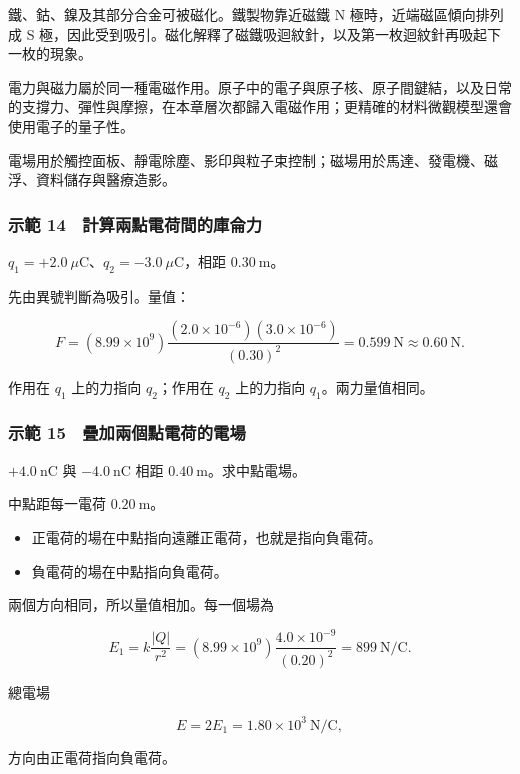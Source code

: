 \documentclass[11pt,a4paper]{article}
\providecommand{\tightlist}{%
  \setlength{\itemsep}{0pt}\setlength{\parskip}{0pt}}
\begin{document}
鐵、鈷、鎳及其部分合金可被磁化。鐵製物靠近磁鐵 N 極時，近端磁區傾向排列成 S 極，因此受到吸引。磁化解釋了磁鐵吸迴紋針，以及第一枚迴紋針再吸起下一枚的現象。

電力與磁力屬於同一種電磁作用。原子中的電子與原子核、原子間鍵結，以及日常的支撐力、彈性與摩擦，在本章層次都歸入電磁作用；更精確的材料微觀模型還會使用電子的量子性。

電場用於觸控面板、靜電除塵、影印與粒子束控制；磁場用於馬達、發電機、磁浮、資料儲存與醫療造影。

\subsubsection{示範 14　計算兩點電荷間的庫侖力}\label{ux793aux7bc4-14-ux8a08ux7b97ux5169ux9edeux96fbux8377ux9593ux7684ux5eabux4f96ux529b}

\(q_1=+2.0\ \mu\mathrm C\)、\(q_2=-3.0\ \mu\mathrm C\)，相距 \(0.30\ \mathrm m\)。

先由異號判斷為吸引。量值：

\[
F=(8.99\times10^9)
\frac{(2.0\times10^{-6})(3.0\times10^{-6})}{(0.30)^2}
=0.599\ \mathrm N
\approx0.60\ \mathrm N.
\]

作用在 \(q_1\) 上的力指向 \(q_2\)；作用在 \(q_2\) 上的力指向 \(q_1\)。兩力量值相同。

\subsubsection{示範 15　疊加兩個點電荷的電場}\label{ux793aux7bc4-15-ux758aux52a0ux5169ux500bux9edeux96fbux8377ux7684ux96fbux5834}

\(+4.0\ \mathrm{nC}\) 與 \(-4.0\ \mathrm{nC}\) 相距 \(0.40\ \mathrm m\)。求中點電場。

中點距每一電荷 \(0.20\ \mathrm m\)。

\begin{itemize}
\tightlist
\item
  正電荷的場在中點指向遠離正電荷，也就是指向負電荷。
\item
  負電荷的場在中點指向負電荷。
\end{itemize}

兩個方向相同，所以量值相加。每一個場為

\[
E_1=k\frac{|Q|}{r^2}
=(8.99\times10^9)\frac{4.0\times10^{-9}}{(0.20)^2}
=899\ \mathrm{N/C}.
\]

總電場

\[
E=2E_1=1.80\times10^3\ \mathrm{N/C},
\]

方向由正電荷指向負電荷。
\end{document}
